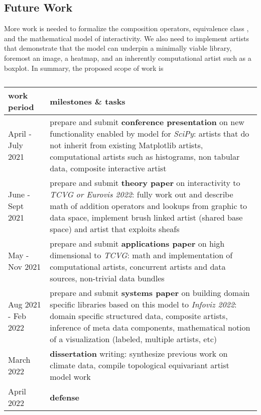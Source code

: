 \documentclass[../main.tex]{subfiles}
\begin{document}
\subsection{Future Work}
More work is needed to formalize the composition operators, equivalence class \vartisteq, and the mathematical model of interactivity. We also need to implement artists that demonstrate that the model can underpin a minimally viable library, foremost an image\cite{haber1990visualization,hansen2011visualization}, a heatmap\cite{wilkinsonHistoryClusterHeat2009,loua1873atlas}, and an inherently computational artist such as a boxplot\cite{wickham40YearsBoxplots2011}. In summary, the proposed scope of work is

\begin{table}[H]
    \centering
    \renewcommand{\arraystretch}{2}
    \begin{tabularx}{\textwidth}{|l|X|}\hline
    \textbf{work period} & \textbf{milestones \& tasks} \\ \hline
    April - July 2021  & prepare and submit \textbf{conference presentation} on new functionality enabled by model for \textit{SciPy}: \newline artists that do not inherit from existing Matplotlib artists, computational artists such as histograms, non tabular data, composite interactive artist \\ \hline
    June - Sept 2021  & prepare and submit \textbf{theory paper} on interactivity to \textit{TCVG or Eurovis 2022}: \newline fully work out and describe math of addition operators and lookups from graphic to data space, implement brush linked artist (shared base space) and artist that exploits sheafs \\ \hline
    May - Nov 2021 & prepare and submit \textbf{applications paper} on high dimensional to \textit{TCVG}: \newline math and implementation of computational artists, concurrent artists and data sources, non-trivial data bundles \\ \hline 
    Aug 2021 - Feb 2022 & prepare and submit \textbf{systems paper} on building domain specific libraries based on this model to \textit{Infoviz 2022}: \newline domain specific structured data, composite artists, inference of meta data components, mathematical notion of a visualization (labeled, multiple artists, etc)\\ \hline
    March 2022 & \textbf{dissertation} writing: \newline synthesize previous work on climate data, compile topological equivariant artist model work \\ \hline
    April 2022 & \textbf{defense} \\ \hline
    \end{tabularx}
    \caption{}
    \label{tab:code:schedule}
\end{table}
\end{document}
